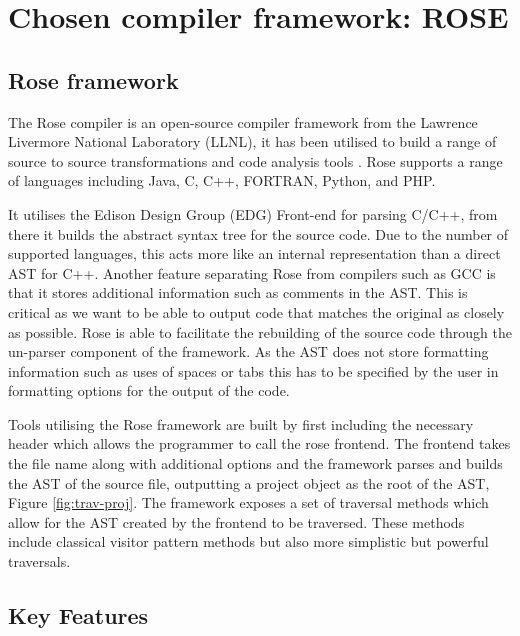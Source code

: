 \documentclass[bsc,frontabs,singlespacing,twoside,parskip,deptreport]{infthesis}
\begin{document}

\section{Chosen compiler framework: ROSE}
\subsection{Rose framework}
The Rose compiler \cite{ROSE} is an open-source compiler framework from the Lawrence Livermore National Laboratory (LLNL), it has been utilised to build a range of source to source transformations and code analysis tools \cite{ROSE_TOOLS}. Rose supports a range of languages including Java, C, C++, FORTRAN, Python, and PHP. 

It utilises the Edison Design Group (EDG) Front-end \cite{EDG} for parsing C/C++, from there it builds the abstract syntax tree for the source code. Due to the number of supported languages, this acts more like an internal representation than a direct AST for C++. Another feature separating Rose from compilers such as GCC is that it stores additional information such as comments in the AST. This is critical as we want to be able to output code that matches the original as closely as possible. Rose is able to facilitate the rebuilding of the source code through the un-parser component of the framework. As the AST does not store formatting information such as uses of spaces or tabs this has to be specified by the user in formatting options for the output of the code.

Tools utilising the Rose framework are built by first including the necessary header which allows the programmer to call the rose frontend. The frontend takes the file name along with additional options and the framework parses and builds the AST of the source file, outputting a project object as the root of the AST, Figure \ref{fig:trav-proj}. The framework exposes a set of traversal methods which allow for the AST created by the frontend to be traversed. These methods include classical visitor pattern methods but also more simplistic but powerful traversals. 

\subsection{Key Features}
\end{document}

